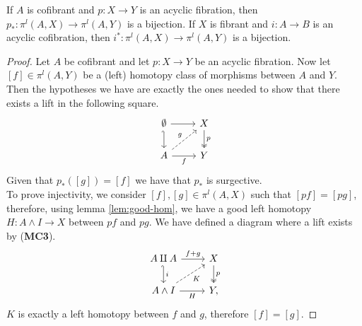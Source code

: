 \begin{lemma}
	\label{lem:bij}
	If $A$ is cofibrant and $p\colon X \longrightarrow Y$ is an acyclic fibration, then $p_*\colon \pi^l(A,X) \longrightarrow \pi^l(A,Y)$ is a bijection. 
	If $X$ is fibrant and $i\colon A \longrightarrow B$ is an acyclic cofibration, then $i^*\colon \pi^l(A,X) \longrightarrow \pi^l(A,Y)$ is a bijection.
\end{lemma}
\begin{proof}
	Let $A$ be cofibrant and let $p\colon X \longrightarrow Y$ be an acyclic fibration. Now let $[f] \in \pi^l(A,Y)$ be a (left) homotopy class of morphisms between $A$ and $Y$. Then the hypotheses we have are exactly the ones needed to show that there exists a lift in the following square.
	\[\begin{tikzcd}
		\emptyset & X \\
		A & Y
		\arrow[from=1-1, to=1-2]
		\arrow[hook', from=1-1, to=2-1]
		\arrow["p", two heads, from=1-2, to=2-2]
		\arrow["g", dashed, from=2-1, to=1-2]
		\arrow["f"', from=2-1, to=2-2]
	\end{tikzcd}\]
	Given that $p_*([g]) = [f]$ we have that $p_*$ is surgective. \\
	To prove injectivity, we consider $[f],[g]\in \pi^l(A,X)$ such that $[pf]=[pg]$, therefore, using lemma \ref{lem:good-hom}, we have a good left homotopy $H\colon A \wedge I \longrightarrow X$ between $pf$ and $pg$. We have defined a diagram where a lift exists by (\textbf{MC3}).
	\[\begin{tikzcd}
		{A \amalg A} & X \\
		{A\wedge I} & {Y,}
		\arrow["{f+g}", from=1-1, to=1-2]
		\arrow["i", hook', from=1-1, to=2-1]
		\arrow["p", two heads, from=1-2, to=2-2]
		\arrow["K"', dashed, from=2-1, to=1-2]
		\arrow["H"', from=2-1, to=2-2]
	\end{tikzcd}\]
	$K$ is exactly a left homotopy between $f$ and $g$, therefore $[f] = [g]$.

\end{proof}

